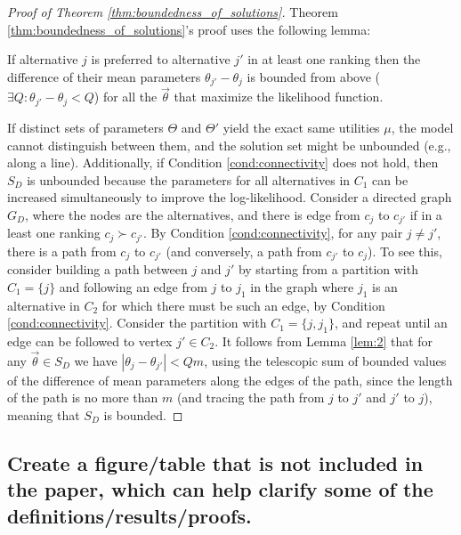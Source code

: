 \begin{proof}[Proof of Theorem \ref{thm:boundedness_of_solutions}]
    Theorem \ref{thm:boundedness_of_solutions}'s proof uses the following lemma:
    \begin{lemma} \label{lem:2}
        If alternative $j$ is preferred to alternative $j'$ in at least one ranking then the difference of their mean parameters $\theta_{j'} - \theta_{j}$ is bounded from above ($\exists Q:\theta_{j'}-\theta_{j}<Q$) for all the $\vec{\theta}$ that maximize the likelihood function.
    \end{lemma}
    If distinct sets of parameters $\Theta$ and $\Theta'$ yield the exact same utilities $\mu$, the model cannot distinguish between them, and the solution set might be unbounded (e.g., along a line).
    Additionally, if Condition \ref{cond:connectivity} does not hold, then $S_{D}$ is unbounded because the parameters for all alternatives in $C_{1}$ can be increased simultaneously to improve the log-likelihood.
    Consider a directed graph $G_{D}$, where the nodes are the alternatives, and there is edge from $c_{j}$ to $c_{j'}$ if in a least one ranking $c_{j} \succ c_{j'}$. By Condition \ref{cond:connectivity}, for any pair $j\neq j'$, there is a path from $c_{j}$ to $c_{j'}$ (and conversely, a path from $c_{j'}$ to $c_{j}$).
    To see this, consider building a path between $j$ and $j'$ by starting from a partition with $C_{1} = \{ j \}$ and following an edge from $j$ to $j_{1}$ in the graph where $j_{1}$ is an alternative in $C_{2}$ for which there must be such an edge, by Condition \ref{cond:connectivity}.
    Consider the partition with $C_{1}=\{ j,j_{1} \}$, and repeat until an edge can be followed to vertex $j' \in C_{2}$.
    It follows from Lemma \ref{lem:2} that for any $\vec{\theta} \in S_{D}$ we have $\left| \theta_{j}  - \theta_{j'} \right| < Qm$, using the telescopic sum of bounded values of the difference of mean parameters along the edges of the path, since the length of the path is no more than $m$ (and tracing the path from $j$ to $j'$ and $j'$ to $j$), meaning that $S_{D}$ is bounded.
\end{proof}

\subsection{
    Create a figure/table that is not included in the paper, which can help clarify some of the definitions/results/proofs.
}

